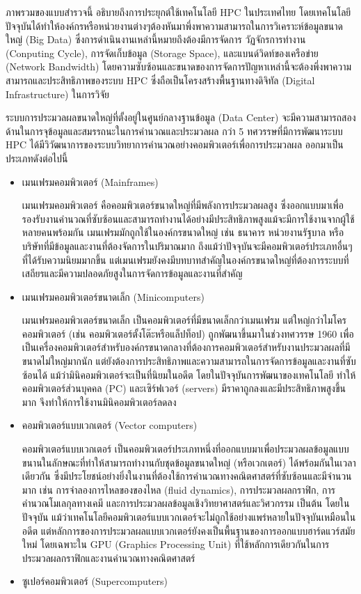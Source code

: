 \documentclass[a4paper,12pt]{extarticle}
\begin{document}
ภาพรวมของแบบสำรวจนี้ อธิบายถึงการประยุกต์ใช้เทคโนโลยี HPC ในประเทศไทย โดยเทคโนโลยีปัจจุบันได้ทำให้องค์กรหรือหน่วยงานต่างๆต้องหันมาพึ่งพาความสามารถในการวิเคราะห์ข้อมูลขนาดใหญ่ (Big Data) ซึ่งการดำเนินงานเหล่านี้หมายถึงต้องมีการจัดการ วัฏจักรการทำงาน (Conputing Cycle), การจัดเก็บข้อมูล (Storage Space), และแบนด์วิดท์ของเครือข่าย (Network Bandwidth) โดยความซับซ้อนและขนาดของการจัดการปัญหาเหล่านี้จะต้องพึ่งพาความสามารถและประสิทธิภาพของระบบ HPC ซึ่งถือเป็นโครงสร้างพื้นฐานทางดิจิทัล (Digital Infrastructure) ในการวิจัย

ระบบการประมวลผลขนาดใหญ่ที่ตั้งอยู่ในศูนย์กลางฐานข้อมูล (Data Center) จะมีความสามารถสองด้านในการจุข้อมูลและสมรรถนะในการคำนวณและประมวลผล กว่า 5 ทศวรรษที่มีการพัฒนาระบบ HPC ได้มีวิวัฒนาการของระบบวิทยาการคำนวณอย่างคอมพิวเตอร์เพื่อการประมวลผล ออกมาเป็นประเภทดังต่อไปนี้
\begin{itemize}
	\item เมนเฟรมคอมพิวเตอร์ (Mainframes)

	เมนเฟรมคอมพิวเตอร์ คือคอมพิวเตอร์ขนาดใหญ่ที่มีพลังการประมวลผลสูง ซึ่งออกแบบมาเพื่อรองรับงานคำนวณที่ซับซ้อนและสามารถทำงานได้อย่างมีประสิทธิภาพสูงแม้จะมีการใช้งานจากผู้ใช้หลายคนพร้อมกัน เมนเฟรมมักถูกใช้ในองค์กรขนาดใหญ่ เช่น ธนาคาร หน่วยงานรัฐบาล หรือบริษัทที่มีข้อมูลและงานที่ต้องจัดการในปริมาณมาก ถึงแม้ว่าปัจจุบันจะมีคอมพิวเตอร์ประเภทอื่นๆ ที่ได้รับความนิยมมากขึ้น แต่เมนเฟรมยังคงมีบทบาทสำคัญในองค์กรขนาดใหญ่ที่ต้องการระบบที่เสถียรและมีความปลอดภัยสูงในการจัดการข้อมูลและงานที่สำคัญ
	\item เมนเฟรมคอมพิวเตอร์ขนาดเล็ก (Minicomputers)

	เมนเฟรมคอมพิวเตอร์ขนาดเล็ก เป็นคอมพิวเตอร์ที่มีขนาดเล็กกว่าเมนเฟรม แต่ใหญ่กว่าไมโครคอมพิวเตอร์ (เช่น คอมพิวเตอร์ตั้งโต๊ะหรือแล็ปท็อป) ถูกพัฒนาขึ้นมาในช่วงทศวรรษ 1960 เพื่อเป็นเครื่องคอมพิวเตอร์สำหรับองค์กรขนาดกลางที่ต้องการคอมพิวเตอร์สำหรับงานประมวลผลที่มีขนาดไม่ใหญ่มากนัก แต่ยังต้องการประสิทธิภาพและความสามารถในการจัดการข้อมูลและงานที่ซับซ้อนได้ แม้ว่ามินิคอมพิวเตอร์จะเป็นที่นิยมในอดีต โดยในปัจจุบันการพัฒนาของเทคโนโลยี ทำให้คอมพิวเตอร์ส่วนบุคคล (PC) และเซิร์ฟเวอร์ (servers) มีราคาถูกลงและมีประสิทธิภาพสูงขึ้นมาก จึงทำให้การใช้งานมินิคอมพิวเตอร์ลดลง
	\item คอมพิวเตอร์แบบเวกเตอร์ (Vector computers)

	คอมพิวเตอร์แบบเวกเตอร์ เป็นคอมพิวเตอร์ประเภทหนึ่งที่ออกแบบมาเพื่อประมวลผลข้อมูลแบบขนานในลักษณะที่ทำให้สามารถทำงานกับชุดข้อมูลขนาดใหญ่ (หรือเวกเตอร์) ได้พร้อมกันในเวลาเดียวกัน ซึ่งมีประโยชน์อย่างยิ่งในงานที่ต้องใช้การคำนวณทางคณิตศาสตร์ที่ซับซ้อนและมีจำนวนมาก เช่น การจำลองการไหลของของไหล (fluid dynamics), การประมวลผลกราฟิก, การคำนวณโมเลกุลทางเคมี และการประมวลผลข้อมูลเชิงวิทยาศาสตร์และวิศวกรรม เป็นต้น โดยในปัจจุบัน แม้ว่าเทคโนโลยีคอมพิวเตอร์แบบเวกเตอร์จะไม่ถูกใช้อย่างแพร่หลายในปัจจุบันเหมือนในอดีต แต่หลักการของการประมวลผลแบบเวกเตอร์ยังคงเป็นพื้นฐานของการออกแบบฮาร์ดแวร์สมัยใหม่ โดยเฉพาะใน GPU (Graphics Processing Unit) ที่ใช้หลักการเดียวกันในการประมวลผลกราฟิกและงานคำนวณทางคณิตศาสตร์
	\item ซูเปอร์คอมพิวเตอร์ (Supercomputers)


\end{itemize}
\end{document}
